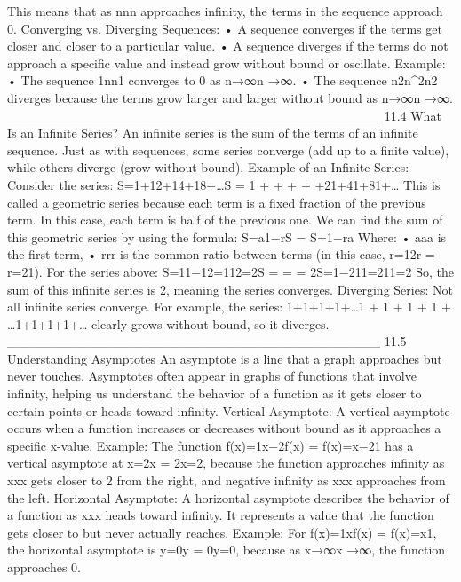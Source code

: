 This means that as nnn approaches infinity, the terms in the sequence approach 0.
Converging vs. Diverging Sequences:
•	A sequence converges if the terms get closer and closer to a particular value.
•	A sequence diverges if the terms do not approach a specific value and instead grow without bound or oscillate.
Example:
•	The sequence 1nn1 converges to 0 as n→∞n \to \inftyn→∞.
•	The sequence n2n^2n2 diverges because the terms grow larger and larger without bound as n→∞n \to \inftyn→∞.
________________________________________
11.4 What Is an Infinite Series?
An infinite series is the sum of the terms of an infinite sequence. Just as with sequences, some series converge (add up to a finite value), while others diverge (grow without bound).
Example of an Infinite Series:
Consider the series:
S=1+12+14+18+…S = 1 +  +  +  + +21+41+81+…
This is called a geometric series because each term is a fixed fraction of the previous term. In this case, each term is half of the previous one.
We can find the sum of this geometric series by using the formula:
S=a1−rS = S=1−ra
Where:
•	aaa is the first term,
•	rrr is the common ratio between terms (in this case, r=12r = r=21).
For the series above:
S=11−12=112=2S =  =  = 2S=1−211=211=2
So, the sum of this infinite series is 2, meaning the series converges.
Diverging Series:
Not all infinite series converge. For example, the series:
1+1+1+1+…1 + 1 + 1 + 1 + \dots1+1+1+1+…
clearly grows without bound, so it diverges.
________________________________________
11.5 Understanding Asymptotes
An asymptote is a line that a graph approaches but never touches. Asymptotes often appear in graphs of functions that involve infinity, helping us understand the behavior of a function as it gets closer to certain points or heads toward infinity.
Vertical Asymptote:
A vertical asymptote occurs when a function increases or decreases without bound as it approaches a specific x-value.
Example: The function f(x)=1x−2f(x) = f(x)=x−21 has a vertical asymptote at x=2x = 2x=2, because the function approaches infinity as xxx gets closer to 2 from the right, and negative infinity as xxx approaches from the left.
Horizontal Asymptote:
A horizontal asymptote describes the behavior of a function as xxx heads toward infinity. It represents a value that the function gets closer to but never actually reaches.
Example: For f(x)=1xf(x) = f(x)=x1, the horizontal asymptote is y=0y = 0y=0, because as x→∞x \to \inftyx→∞, the function approaches 0.
